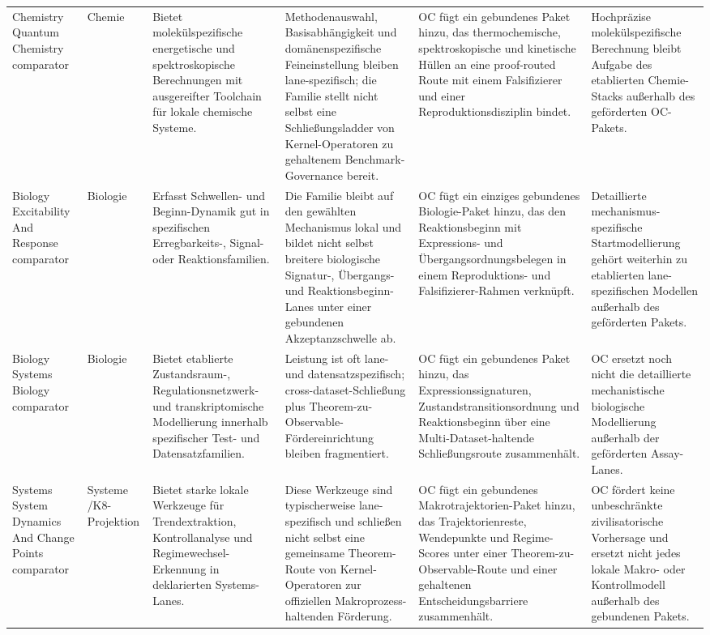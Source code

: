 \begin{longtable}{@{}L{0.17\textwidth}L{0.09\textwidth}L{0.17\textwidth}L{0.17\textwidth}L{0.20\textwidth}L{0.14\textwidth}@{}}
Chemistry Quantum Chemistry comparator & Chemie & Bietet molekülspezifische energetische und spektroskopische Berechnungen mit ausgereifter Toolchain für lokale chemische Systeme. & Methodenauswahl, Basisabhängigkeit und domänenspezifische Feineinstellung bleiben lane-spezifisch; die Familie stellt nicht selbst eine Schließungsladder von Kernel-Operatoren zu gehaltenem Benchmark-Governance bereit. & OC fügt ein gebundenes Paket hinzu, das thermochemische, spektroskopische und kinetische Hüllen an eine proof-routed Route mit einem Falsifizierer und einer Reproduktionsdisziplin bindet. & Hochpräzise molekülspezifische Berechnung bleibt Aufgabe des etablierten Chemie-Stacks außerhalb des geförderten OC-Pakets. \\
Biology Excitability And Response comparator & Biologie & Erfasst Schwellen- und Beginn-Dynamik gut in spezifischen Erregbarkeits-, Signal- oder Reaktionsfamilien. & Die Familie bleibt auf den gewählten Mechanismus lokal und bildet nicht selbst breitere biologische Signatur-, Übergangs- und Reaktionsbeginn-Lanes unter einer gebundenen Akzeptanzschwelle ab. & OC fügt ein einziges gebundenes Biologie-Paket hinzu, das den Reaktionsbeginn mit Expressions- und Übergangsordnungsbelegen in einem Reproduktions- und Falsifizierer-Rahmen verknüpft. & Detaillierte mechanismus-spezifische Startmodellierung gehört weiterhin zu etablierten lane-spezifischen Modellen außerhalb des geförderten Pakets. \\
Biology Systems Biology comparator & Biologie & Bietet etablierte Zustandsraum-, Regulationsnetzwerk- und transkriptomische Modellierung innerhalb spezifischer Test- und Datensatzfamilien. & Leistung ist oft lane- und datensatzspezifisch; cross-dataset-Schließung plus Theorem-zu-Observable-Fördereinrichtung bleiben fragmentiert. & OC fügt ein gebundenes Paket hinzu, das Expressionssignaturen, Zustandstransitionsordnung und Reaktionsbeginn über eine Multi-Dataset-haltende Schließungsroute zusammenhält. & OC ersetzt noch nicht die detaillierte mechanistische biologische Modellierung außerhalb der geförderten Assay-Lanes. \\
Systems System Dynamics And Change Points comparator & Systeme /\allowbreak K8-Projektion & Bietet starke lokale Werkzeuge für Trendextraktion, Kontrollanalyse und Regimewechsel-Erkennung in deklarierten Systems-Lanes. & Diese Werkzeuge sind typischerweise lane-spezifisch und schließen nicht selbst eine gemeinsame Theorem-Route von Kernel-Operatoren zur offiziellen Makroprozess-haltenden Förderung. & OC fügt ein gebundenes Makrotrajektorien-Paket hinzu, das Trajektorienreste, Wendepunkte und Regime-Scores unter einer Theorem-zu-Observable-Route und einer gehaltenen Entscheidungsbarriere zusammenhält. & OC fördert keine unbeschränkte zivilisatorische Vorhersage und ersetzt nicht jedes lokale Makro- oder Kontrollmodell außerhalb des gebundenen Pakets. \\

\end{longtable}

